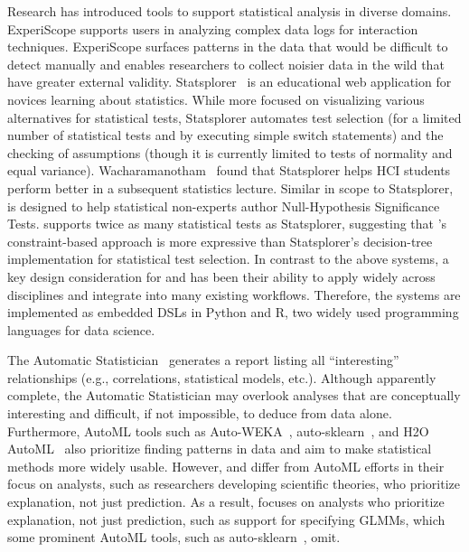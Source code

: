 Research has introduced tools to support statistical analysis in diverse
domains. ExperiScope \cite{guimbretiere2007experiscope} supports users in
analyzing complex data logs for interaction techniques. ExperiScope surfaces
patterns in the data that would be difficult to detect manually and enables
researchers to collect noisier data in the wild that have greater external
validity. Statsplorer~\cite{wacharamanotham2015statsplorer} is an educational
web application for novices learning about statistics. While more focused on
visualizing various alternatives for statistical tests, Statsplorer automates
test selection (for a limited number of statistical tests and by executing
simple switch statements) and the checking of assumptions (though it is
currently limited to tests of normality and equal variance).
Wacharamanotham~\cite{wacharamanotham2015statsplorer} found that Statsplorer
helps HCI students perform better in a subsequent statistics lecture. Similar in
scope to Statsplorer, \tea is designed to help statistical non-experts author
Null-Hypothesis Significance Tests. \tea supports twice as many statistical
tests as Statsplorer, suggesting that \tea's constraint-based approach is more
expressive than Statsplorer's decision-tree implementation for statistical test
selection. In contrast to the above systems, a key design consideration for \tea
and \tisane has been their ability to apply widely across disciplines and
integrate into many existing workflows. Therefore, the systems are implemented
as embedded DSLs in Python and R, two widely used programming languages for data
science.

The Automatic Statistician~\cite{lloyd2014automatic} generates a report listing
all ``interesting'' relationships (e.g., correlations, statistical models,
etc.). %
Although apparently complete, the Automatic Statistician may overlook analyses
that are conceptually interesting and difficult, if not impossible, to deduce
from data alone. Furthermore, AutoML tools such as Auto-WEKA~\cite{autoweka},
auto-sklearn~\cite{autosklearn}, and H2O AutoML~\cite{H2OAutoML20} also
prioritize finding patterns in data and aim to make statistical methods more
widely usable. However, \tea and \tisane differ from AutoML efforts in their
focus on analysts, such as researchers developing scientific theories, who
prioritize explanation, not just prediction. As a result, \tisane focuses on
analysts who prioritize explanation, not just prediction, such as support for
specifying GLMMs, which some prominent AutoML tools, such as
auto-sklearn~\cite{autosklearn}, omit. 


